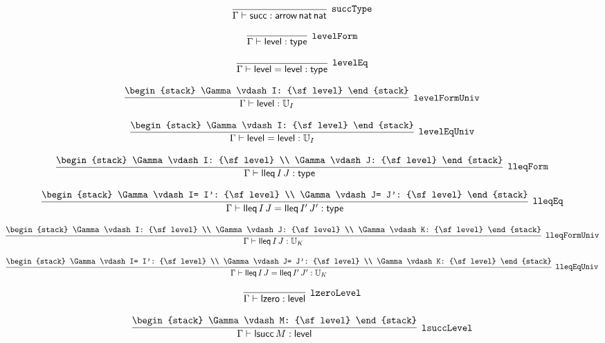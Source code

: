\[
\infer[{\tt succType}]{\Gamma \vdash {\sf succ}: {\sf arrow}\,{\sf nat}\,{\sf nat}}{}
\]

\[
\infer[{\tt levelForm}]{\Gamma \vdash {\sf level}: {\sf type}}{}
\]

\[
\infer[{\tt levelEq}]{\Gamma \vdash {\sf level}= {\sf level}: {\sf type}}{}
\]

\[
\infer[{\tt levelFormUniv}]{\Gamma \vdash {\sf level}: {\Bbb U}_{I}}{
\begin{stack}
\Gamma \vdash I: {\sf level}
\end{stack}}
\]

\[
\infer[{\tt levelEqUniv}]{\Gamma \vdash {\sf level}= {\sf level}: {\Bbb U}_{I}}{
\begin{stack}
\Gamma \vdash I: {\sf level}
\end{stack}}
\]

\[
\infer[{\tt lleqForm}]{\Gamma \vdash {\sf lleq}\,I\,J: {\sf type}}{
\begin{stack}
\Gamma \vdash I: {\sf level}
\\
\Gamma \vdash J: {\sf level}
\end{stack}}
\]

\[
\infer[{\tt lleqEq}]{\Gamma \vdash {\sf lleq}\,I\,J= {\sf lleq}\,I'\,J': {\sf type}}{
\begin{stack}
\Gamma \vdash I= I': {\sf level}
\\
\Gamma \vdash J= J': {\sf level}
\end{stack}}
\]

\[
\infer[{\tt lleqFormUniv}]{\Gamma \vdash {\sf lleq}\,I\,J: {\Bbb U}_{K}}{
\begin{stack}
\Gamma \vdash I: {\sf level}
\\
\Gamma \vdash J: {\sf level}
\\
\Gamma \vdash K: {\sf level}
\end{stack}}
\]

\[
\infer[{\tt lleqEqUniv}]{\Gamma \vdash {\sf lleq}\,I\,J= {\sf lleq}\,I'\,J': {\Bbb U}_{K}}{
\begin{stack}
\Gamma \vdash I= I': {\sf level}
\\
\Gamma \vdash J= J': {\sf level}
\\
\Gamma \vdash K: {\sf level}
\end{stack}}
\]

\[
\infer[{\tt lzeroLevel}]{\Gamma \vdash {\sf lzero}: {\sf level}}{}
\]

\[
\infer[{\tt lsuccLevel}]{\Gamma \vdash {\sf lsucc}\,M: {\sf level}}{
\begin{stack}
\Gamma \vdash M: {\sf level}
\end{stack}}
\]

